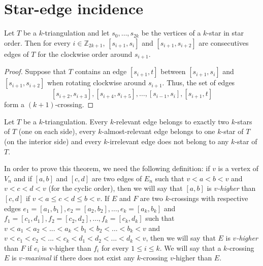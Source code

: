 \documentclass[12pt]{amsart}
\begin{document}
\section{Star-edge incidence}

\begin{lemma}\label{starcaracterization}
Let $T$ be a $k$-triangulation and let $s_0,\ldots,s_{2k}$ be the vertices of a $k$-star in star order. Then for every $i\in\mathbb{Z}_{2k+1}$, $[s_{i+1},s_{i}]$ and $[s_{i+1},s_{i+2}]$ are consecutives edges of $T$ for the clockwise order around $s_{i+1}$.
\end{lemma}

\begin{proof}
Suppose that $T$ contains an edge $[s_{i+1},t]$ between $[s_{i+1},s_{i}]$ and $[s_{i+1},s_{i+2}]$ when rotating clockwise around $s_{i+1}$. Thus, the set of edges $$[s_{i+2},s_{i+3}],[s_{i+4},s_{i+5}],\ldots,[s_{i-1},s_{i}],[s_{i+1},t]$$ form a $(k+1)$-crossing.
\end{proof}

\begin{theorem}\label{incidences}
Let $T$ be a $k$-triangulation. Every $k$-relevant edge belongs to exactly two $k$-stars of $T$ (one on each side), every $k$-almost-relevant edge belongs to one $k$-star of $T$ (on the interior side) and every $k$-irrelevant edge does not belong to any $k$-star of $T$.
\end{theorem}

In order to prove this theorem, we need the following definition: if $v$ is a vertex of $V_n$ and if $[a,b]$ and $[c,d]$ are two edges of $E_n$ such that $v<a<b<v$ and $v<c<d<v$ (for the cyclic order), then we will say that $[a,b]$ is \emph{$v$-higher} than $[c,d]$ if $v<a\le c<d\le b<v$. If $E$ and $F$ are two $k$-crossings with respective edges $e_1=[a_1,b_1],e_2=[a_2,b_2],\ldots,e_k=[a_k,b_k]$ and $f_1=[c_1,d_1],f_2=[c_2,d_2],\ldots,f_k=[c_k,d_k]$ such that $v<a_1<a_2<...<a_k<b_1<b_2<...<b_k<v$ and $v<c_1<c_2<...<c_k<d_1<d_2<...<d_k<v$, then we will say that $E$ is \emph{$v$-higher} than $F$ if $e_i$ is v-higher than $f_i$ for every $1\le i\le k$. We will say that a $k$-crossing $E$ is \emph{$v$-maximal} if there does not exist any $k$-crossing $v$-higher than $E$.
\end{document}
